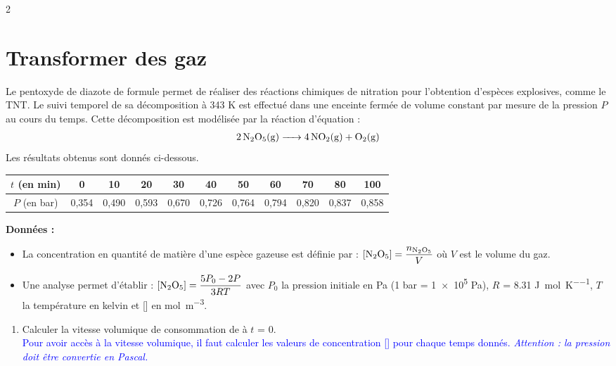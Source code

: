 \documentclass[a4paper,11pt,fleqn]{article}%
\begin{document}
\begin{multicols}{2}
\section{Transformer des gaz}
Le pentoxyde de diazote de formule  permet de réaliser des réactions chimiques de nitration pour l'obtention d'espèces explosives, comme le TNT. Le suivi temporel de sa décomposition à \num{343} \unit{\kelvin} est effectué dans une enceinte fermée de volume constant par mesure de la pression $P$ au cours du temps. Cette décomposition est modélisée par la réaction d'équation :
\begin{eqnarray}
    \ce{2N2O5(g) -> 4NO2(g) + O2(g)}\nonumber
\end{eqnarray}
Les résultats obtenus sont donnés ci-dessous.
\\
\begin{tabular}{|c|c|c|c|c|c|c|c|c|c|c|}
    \hline $t$ (en min) & 0 & 10 & 20 & 30 & 40 & 50 & 60 & 70 & 80 & 100\\
    \hline $P$ (en bar) & 0,354 & 0,490 & 0,593 & 0,670 & 0,726 & 0,764 & 0,794 & 0,820 & 0,837 & 0,858\\
    \hline
\end{tabular}
\textbf{Données :}\\
\begin{itemize}
    \item La concentration en quantité de matière d'une espèce gazeuse est définie par : $[\ce{N2O5}] = \dfrac{n_{\ce{N2O5}}}{V}$ où $V$ est le volume du gaz.
    \item Une analyse permet d'établir : $[\ce{N2O5}] = \dfrac{5P_0-2P}{3RT}$ avec $P_0$ la pression initiale en \unit{\pascal} (1 bar = \num{1e5} \unit{\pascal}), $R$ = \num{8,31} \unit{\joule\per\mole\per\kelvin}, $T$ la température  en kelvin et [] en \unit{\mole\per\meter\cubed}.
\end{itemize}
\begin{enumerate}
    \item Calculer la vitesse volumique de consommation de  à $t$ = 0.\\
    \textcolor{blue}{Pour avoir accès à la vitesse volumique, il faut calculer les valeurs de concentration [] pour chaque temps donnés. \emph{Attention : la pression doit être convertie en Pascal.}}\\
\end{enumerate}


\end{multicols}
\end{document}
